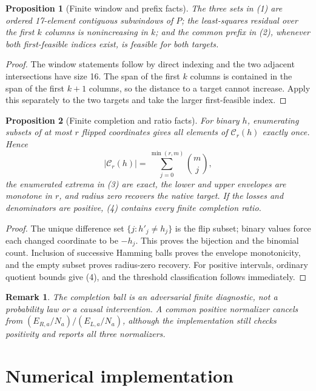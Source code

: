\documentclass[11pt]{article}
\newtheorem{proposition}{Proposition}
\newtheorem{remark}{Remark}
\begin{document}
\begin{proposition}[Finite window and prefix facts]
The three sets in (1) are ordered 17-element contiguous subwindows of $P$;
the least-squares residual over the first $k$ columns is nonincreasing in
$k$; and the common prefix in (2), whenever both first-feasible indices
exist, is feasible for both targets.
\end{proposition}

\begin{proof}
The window statements follow by direct indexing and the two adjacent
intersections have size 16.  The span of the first $k$ columns is contained
in the span of the first $k+1$ columns, so the distance to a target cannot
increase.  Apply this separately to the two targets and take the larger
first-feasible index.
\end{proof}

\begin{proposition}[Finite completion and ratio facts]
For binary $h$, enumerating subsets of at most $r$ flipped coordinates gives
all elements of $\mathcal C_r(h)$ exactly once.  Hence
\[
 |\mathcal C_r(h)|=\sum_{j=0}^{\min(r,m)}\binom mj,
\]
the enumerated extrema in (3) are exact, the lower and upper envelopes are
monotone in $r$, and radius zero recovers the native target.  If the losses
and denominators are positive, (4) contains every finite completion ratio.
\end{proposition}

\begin{proof}
The unique difference set $\{j:h'_j\ne h_j\}$ is the flip subset; binary
values force each changed coordinate to be $-h_j$.  This proves the bijection
and the binomial count.  Inclusion of successive Hamming balls proves the
envelope monotonicity, and the empty subset proves radius-zero recovery.
For positive intervals, ordinary quotient bounds give (4), and the threshold
classification follows immediately.
\end{proof}

\begin{remark}
The completion ball is an adversarial finite diagnostic, not a probability
law or a causal intervention.  A common positive normalizer cancels from
$(E_{R,a}/N_a)/(E_{L,a}/N_a)$, although the implementation still checks
positivity and reports all three normalizers.
\end{remark}

\section{Numerical implementation}
\end{document}
